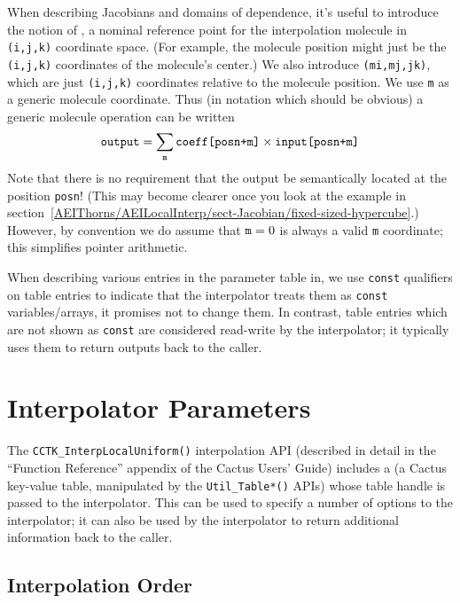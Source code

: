 When describing Jacobians and domains of dependence, it's useful to
introduce the notion of , a nominal reference
point for the interpolation molecule in \verb|(i,j,k)| coordinate
space.  (For example, the molecule position might just be the \verb|(i,j,k)|
coordinates of the molecule's center.)  We also introduce
 \verb|(mi,mj,jk)|, which are just
\verb|(i,j,k)| coordinates relative to the molecule position.
We use \verb|m| as a generic molecule coordinate.  Thus
(in notation which should be obvious) a generic molecule operation
can be written
\begin{equation}
\verb|output| = \sum_{\tt m} \verb|coeff[posn+m]| \times \verb|input[posn+m]|
\end{equation}
Note that there is no requirement that the output be semantically
located at the position \verb|posn|!  (This may become clearer once
you look at the example in
section~\ref{AEIThorns/AEILocalInterp/sect-Jacobian/fixed-sized-hypercube}.)
However, by convention we do assume that $\verb|m|=0$ is always a valid
\verb|m| coordinate; this simplifies pointer arithmetic.

When describing various entries in the parameter table in,
we use \verb|const| qualifiers on table entries to indicate that the
interpolator treats them as \verb|const| variables/arrays, \ie{} it
promises not to change them.  In contrast, table entries which are
not shown as \verb|const| are considered read-write by the interpolator;
it typically uses them to return outputs back to the caller.


\section{Interpolator Parameters}

The \verb|CCTK_InterpLocalUniform()| interpolation API
(described in detail in the ``Function Reference'' appendix of
the Cactus Users' Guide) includes a 
(a Cactus key-value table, manipulated by the \verb|Util_Table*()| APIs)
whose table handle is passed to the interpolator.  This can be used
to specify a number of options to the interpolator; it can also be
used by the interpolator to return additional information back to
the caller.


\subsection{Interpolation Order}

